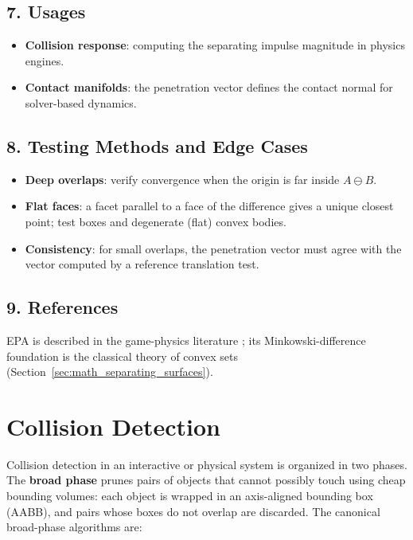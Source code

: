 \subsection{7. Usages}

\begin{itemize}
\item \textbf{Collision response}: computing the separating impulse
  magnitude in physics engines.
\item \textbf{Contact manifolds}: the penetration vector defines the
  contact normal for solver-based dynamics.
\end{itemize}

\subsection{8. Testing Methods and Edge Cases}

\begin{itemize}
\item \textbf{Deep overlaps}: verify convergence when the origin is far
  inside $A \ominus B$.
\item \textbf{Flat faces}: a facet parallel to a face of the difference
  gives a unique closest point; test boxes and degenerate (flat) convex
  bodies.
\item \textbf{Consistency}: for small overlaps, the penetration vector must
  agree with the vector computed by a reference translation test.
\end{itemize}

\subsection{9. References}

EPA is described in the game-physics literature
\cite{vandenbergen2004,ericson2004}; its Minkowski-difference foundation is
the classical theory of convex sets (Section~\ref{sec:math_separating_surfaces}).

\section{Collision Detection}
\label{sec:convexint_collision}

Collision detection in an interactive or physical system is organized in
two phases. The \textbf{broad phase} prunes pairs of objects that cannot
possibly touch using cheap bounding volumes: each object is wrapped in an
axis-aligned bounding box (AABB), and pairs whose boxes do not overlap are
discarded. The canonical broad-phase algorithms are:

